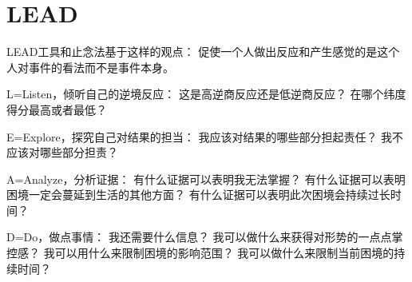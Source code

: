 
\chapter{LEAD}


LEAD工具和止念法基于这样的观点：
促使一个人做出反应和产生感觉的是这个人对事件的看法而不是事件本身。


L=Listen，倾听自己的逆境反应：
这是高逆商反应还是低逆商反应？
在哪个纬度得分最高或者最低？

E=Explore，探究自己对结果的担当：
我应该对结果的哪些部分担起责任？
我不应该对哪些部分担责？

A=Analyze，分析证据：
有什么证据可以表明我无法掌握？
有什么证据可以表明困境一定会蔓延到生活的其他方面？
有什么证据可以表明此次困境会持续过长时间？

D=Do，做点事情：
我还需要什么信息？
我可以做什么来获得对形势的一点点掌控感？
我可以用什么来限制困境的影响范围？
我可以做什么来限制当前困境的持续时间？


